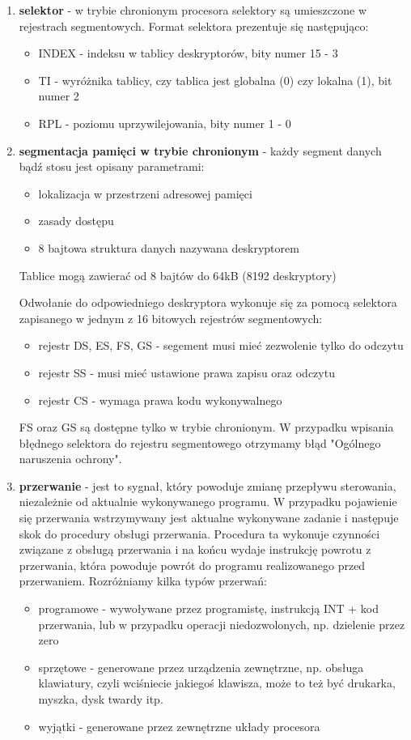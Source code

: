 \documentclass[a4paper,12pt]{article}
\begin{document}
\begin{enumerate}
				\item{\textbf{selektor} - w trybie chronionym procesora selektory są umieszczone w rejestrach segmentowych. Format selektora prezentuje się następująco:}

\begin{itemize}
\item{INDEX - indeksu w tablicy deskryptorów, bity numer 15 - 3}
\item{TI - wyróżnika tablicy, czy tablica jest globalna (0) czy lokalna (1), bit numer 2}
\item{RPL - poziomu uprzywilejowania, bity numer 1 - 0}
\end{itemize}


\item{\textbf{segmentacja pamięci w trybie chronionym} - każdy segment danych bądź stosu jest opisany parametrami:
\begin{itemize}
\item{lokalizacja w przestrzeni adresowej pamięci}
\item{zasady dostępu}
\item{8 bajtowa struktura danych nazywana deskryptorem}
\end{itemize}
Tablice mogą zawierać od 8 bajtów do 64kB (8192 deskryptory)

Odwołanie do odpowiedniego deskryptora wykonuje się za pomocą selektora zapisanego w jednym z 16 bitowych rejestrów segmentowych: 

\begin{itemize}
\item{rejestr DS, ES, FS, GS - segement musi mieć zezwolenie tylko do odczytu}
\item{rejestr SS - musi mieć ustawione prawa zapisu oraz odczytu}
\item{rejestr CS - wymaga prawa kodu wykonywalnego}
\end{itemize}
FS oraz GS są dostępne tylko w trybie chronionym. W przypadku wpisania błędnego selektora do rejestru segmentowego otrzymamy błąd "Ogólnego naruszenia ochrony". }
	
	\item{\textbf{przerwanie} - jest to sygnał, który powoduje zmianę przepływu sterowania, niezależnie od aktualnie wykonywanego programu. W przypadku pojawienie się przerwania wstrzymywany jest aktualne wykonywane zadanie i następuje skok do procedury obsługi przerwania. Procedura ta wykonuje czynności związane z obsługą przerwania i na końcu wydaje instrukcję powrotu z przerwania, która powoduje powrót do programu realizowanego przed przerwaniem.
Rozróżniamy kilka typów przerwań:}
\begin{itemize}
\item{programowe - wywoływane przez programistę, instrukcją INT + kod przerwania, lub w przypadku operacji niedozwolonych, np. dzielenie przez zero}
\item{sprzętowe - generowane przez urządzenia zewnętrzne, np. obsługa klawiatury, czyli wciśniecie jakiegoś klawisza, może to też być drukarka, myszka, dysk twardy itp.}
\item{wyjątki - generowane przez zewnętrzne układy procesora}
\end{itemize}


\end{enumerate}
\end{document}
